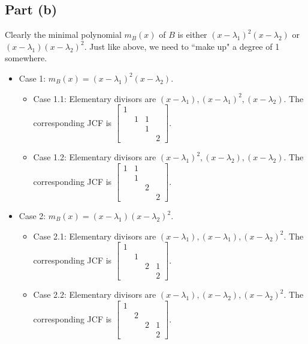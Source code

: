 \documentclass[12pt]{article}
\begin{document}
\subsection*{Part (b)}
Clearly the minimal polynomial $m_B(x)$ of $B$ is either 
$(x-\lambda_1)^2(x-\lambda_2)$
or $(x-\lambda_1)(x-\lambda_2)^2$.
Just like above, we need to ``make up" a degree of 1 somewhere.

\begin{itemize}
    \item Case 1: $m_B(x)=(x-\lambda_1)^2(x-\lambda_2)$.
        \begin{itemize}
            \item Case 1.1: Elementary divisors are
                $(x-\lambda_1), (x-\lambda_1)^2, (x-\lambda_2)$.
                The corresponding JCF is $
                \begin{bmatrix} 
                    1& & & \\
                     &1&1& \\
                     & &1& \\
                     & & &2
                \end{bmatrix}$. 
            \item Case 1.2: Elementary divisors are
                $(x-\lambda_1)^2, (x-\lambda_2), (x-\lambda_2)$.
                The corresponding JCF is $
                \begin{bmatrix} 
                    1&1& & \\
                     &1& & \\
                     & &2& \\
                     & & &2
                \end{bmatrix}$. 
        \end{itemize}
    \item Case 2: $m_B(x)=(x-\lambda_1)(x-\lambda_2)^2$.
        \begin{itemize}
            \item Case 2.1: Elementary divisors are
                $(x-\lambda_1), (x-\lambda_1), (x-\lambda_2)^2$.
                The corresponding JCF is $
                \begin{bmatrix} 
                    1& & & \\
                     &1& & \\
                     & &2&1\\
                     & & &2
                \end{bmatrix}$. 
            \item Case 2.2: Elementary divisors are
                $(x-\lambda_1), (x-\lambda_2), (x-\lambda_2)^2$.
                The corresponding JCF is $
                \begin{bmatrix} 
                    1& & & \\
                     &2& & \\
                     & &2&1\\
                     & & &2
                \end{bmatrix}$. 
        \end{itemize}
\end{itemize}
\end{document}
